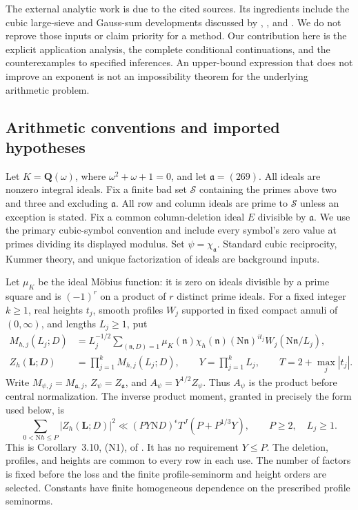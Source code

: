 \documentclass[11pt]{article}
\theoremstyle{remark}\newtheorem{remark}[theorem]{Remark}
\newcommand{\N}{\mathrm N}
\begin{document}
The external analytic work is due to the cited sources. Its ingredients include the cubic large-sieve and Gauss-sum developments discussed by \citet{df26}, \citet{ddfs26}, and \citet{dr24}. We do not reprove those inputs or claim priority for a method. Our contribution here is the explicit application analysis, the complete conditional continuations, and the counterexamples to specified inferences. An upper-bound expression that does not improve an exponent is not an impossibility theorem for the underlying arithmetic problem.

\subsection{Arithmetic conventions and imported hypotheses}

Let $K=\mathbf Q(\omega)$, where $\omega^2+\omega+1=0$, and let $\mathfrak a=(269)$. All ideals are nonzero integral ideals. Fix a finite bad set $\mathcal S$ containing the primes above two and three and excluding $\mathfrak a$. All row and column ideals are prime to $\mathcal S$ unless an exception is stated. Fix a common column-deletion ideal $E$ divisible by $\mathfrak a$. We use the primary cubic-symbol convention and include every symbol's zero value at primes dividing its displayed modulus. Set $\psi=\chi_{\mathfrak a}$. Standard cubic reciprocity, Kummer theory, and unique factorization of ideals are background inputs.

Let $\mu_K$ be the ideal M\"obius function: it is zero on ideals divisible by a prime square and is $(-1)^r$ on a product of $r$ distinct prime ideals. For a fixed integer $k\ge1$, real heights $t_j$, smooth profiles $W_j$ supported in fixed compact annuli of $(0,\infty)$, and lengths $L_j\ge1$, put
\begin{align}
M_{h,j}(L_j;D)
 &=L_j^{-1/2}\sum_{(\mathfrak n,D)=1}
 \mu_K(\mathfrak n)\chi_h(\mathfrak n)(\N\mathfrak n)^{it_j}
 W_j(\N\mathfrak n/L_j),\label{eq:defM}\\
Z_h(\mathbf L;D)&=\prod_{j=1}^kM_{h,j}(L_j;D),\qquad
Y=\prod_{j=1}^kL_j,\qquad T=2+\max_j|t_j|.
\end{align}
Write $M_{\psi,j}=M_{\mathfrak a,j}$, $Z_\psi=Z_{\mathfrak a}$, and $A_\psi=Y^{1/2}Z_\psi$. Thus $A_\psi$ is the product before central normalization. The inverse product moment, granted in precisely the form used below, is
\begin{equation}
\sum_{0<\N h\le P}|Z_h(\mathbf L;D)|^2
\ll(PY\N D)^\epsilon T^J(P+P^{1/3}Y),
\qquad P\ge2,\quad L_j\ge1.
\tag{N}\label{eq:N}
\end{equation}
This is Corollary~3.10, (N1), of \citet{bt52v4,bt52v5}. It has no requirement $Y\le P$. The deletion, profiles, and heights are common to every row in each use. The number of factors is fixed before the loss and the finite profile-seminorm and height orders are selected. Constants have finite homogeneous dependence on the prescribed profile seminorms.
\end{document}

